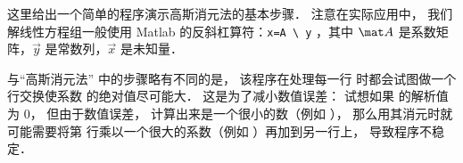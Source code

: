 

这里给出一个简单的程序演示高斯消元法的基本步骤． 注意在实际应用中， 我们解线性方程组一般使用 Matlab 的反斜杠算符：\lstinline|x=A \ y| ，其中 $\mat A$ 是系数矩阵，$\vec y$ 是常数列，$\vec x$ 是未知量．


与“高斯消元法” 中的步骤略有不同的是， 该程序在处理每一行   时都会试图做一个行交换使系数  的绝对值尽可能大． 这是为了减小数值误差： 试想如果  的解析值为 0， 但由于数值误差， 计算出来是一个很小的数（例如 ）， 那么用其消元时就可能需要将第  行乘以一个很大的系数（例如 ）再加到另一行上， 导致程序不稳定．

